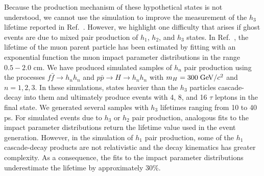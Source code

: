 \documentclass[twocolumn,10pt,prl,preprint,floatfix,nofootinbib,superscriptaddress,showpacs,amssymb]{revtex4}
\begin{document}
 Because the production mechanism of these hypothetical states is not
 understood, we cannot use the simulation to improve the measurement of
 the $h_3$ lifetime reported in Ref.~\cite{a0disc}. However, we 
 highlight one difficulty that arises if ghost events are due to mixed
 pair production of $h_1$, $h_2$, and $h_3$ states. In Ref.~\cite{a0disc},
 the lifetime of the muon parent particle has been estimated by fitting
 with an exponential function
 the muon impact parameter distributions in the range $0.5-2.0$ cm. 
 We have produced simulated samples of $h_n$ pair production using the processes
 $f\bar{f} \rightarrow h_n h_n$ and
 $p\bar{p} \rightarrow H \rightarrow h_n h_n$ with $m_H=300 \; {\rm GeV/}c^2$ 
 and $n=1,2,3$. In these simulations, states heavier than the $h_3$ particles
 cascade-decay into them and ultimately produce  events with 4, 8, and
 16 $\tau$ leptons in the final state. We generated several samples with 
 $h_3$ lifetimes ranging from 10 to 40 ps. For simulated events due to $h_3$
 or $h_2$ pair production, analogous fits to the impact parameter distributions
  return the lifetime value used
 in the event generation. However, in the simulation of $h_1$ pair production,
 some of the $h_1$ cascade-decay products are not relativistic and the decay
 kinematics has greater complexity. As a consequence, the  fits to 
 the impact parameter distributions
 underestimate the lifetime by approximately 30\%.
\end{document}
